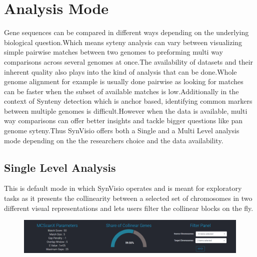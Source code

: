 \section{Analysis Mode}
Gene sequences can be compared in different ways depending on the underlying biological question.Which means syteny analysis can vary between visualizing simple pairwise matches between two genomes to preforming multi way comparisons across several genomes at once.The availability of datasets and their inherent quality also plays into the kind of analysis that can be done.Whole genome alignment for example is usually done pairwise as looking for matches can be faster when the subset of available matches is low.Additionally in the context of Synteny detection which is anchor   based, identifying common markers between multiple genomes is difficult.However when the data is available, multi way comparisons can offer better insights and tackle bigger questions like pan genome syteny.Thus SynVisio offers both a Single and a Multi Level analysis mode depending on the the researchers choice and the data availability.

\subsection{Single Level Analysis}
This is default mode in which SynVisio operates and is meant for exploratory tasks as it presents the collinearity between a selected set of chromosomes in two different visual representations and lets users filter the collinear blocks on the fly.

\begin{figure}
  \centering
  \includegraphics[width=1\linewidth]{images/ch_5_baseparameters.PNG}
  \label{fig:ch_5_baseparameters}
\end{figure}


